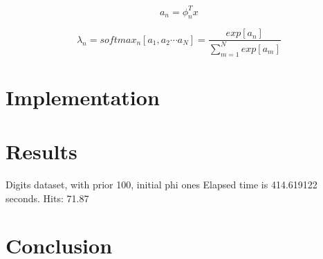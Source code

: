 \documentclass[12pt]{article}
\begin{document}
\begin{equation}
\label{activations}
a_{n} = \phi_{n}^{T}x\,
\end{equation}

\begin{equation}
\label{softmax}
\lambda_{n} = softmax_{n}[a_{1}, a_{2} \cdots a_{N}] = 
\frac{exp[a_{n}]} {\sum_{m = 1}^{N} exp[a_{m}] }\,
\end{equation}
 
\section{Implementation}


\section{Results}

Digits dataset, with prior 100, initial phi ones
Elapsed time is 414.619122 seconds.
Hits: 71.87%

\section{Conclusion}


 
\end{document}
